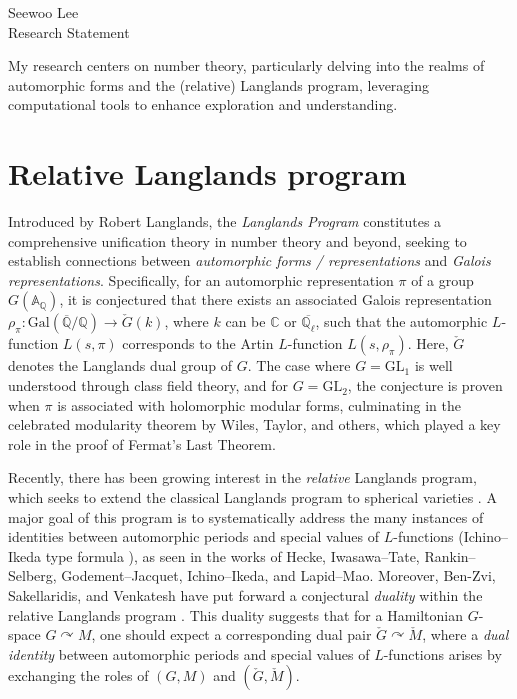 \documentclass[12pt]{article}
\begin{document}
\noindent Seewoo Lee \\
Research Statement \\
\bigskip



My research centers on number theory, particularly delving into the realms of automorphic forms and the (relative) Langlands program, leveraging computational tools to enhance exploration and understanding.


\section*{Relative Langlands program}

Introduced by Robert Langlands, the \emph{Langlands Program} constitutes a comprehensive unification theory in number theory and beyond, seeking to establish connections between \emph{automorphic forms / representations} and \emph{Galois representations}.
Specifically, for an automorphic representation $\pi$ of a group $G(\mathbb{A}_{\mathbb{Q}})$, it is conjectured that there exists an associated Galois representation $\rho_{\pi}: \mathrm{Gal}(\overline{\mathbb{Q}} / \mathbb{Q}) \to \check{G}(k)$, where $k$ can be $\mathbb{C}$ or $\overline{\mathbb{Q}_{\ell}}$, such that the automorphic $L$-function $L(s, \pi)$ corresponds to the Artin $L$-function $L(s, \rho_{\pi})$. Here, $\check{G}$ denotes the Langlands dual group of $G$. The case where $G = \mathrm{GL}_{1}$ is well understood through class field theory, and for $G = \mathrm{GL}_{2}$, the conjecture is proven when $\pi$ is associated with holomorphic modular forms, culminating in the celebrated modularity theorem by Wiles, Taylor, and others, which played a key role in the proof of Fermat’s Last Theorem.

Recently, there has been growing interest in the \emph{relative} Langlands program, which seeks to extend the classical Langlands program to spherical varieties \cite{sakellaridis2012spherical,sakellaridis2017periods}.
A major goal of this program is to systematically address the many instances of identities between automorphic periods and special values of $L$-functions (Ichino--Ikeda type formula \cite{ichino2010periods}), as seen in the works of Hecke, Iwasawa--Tate, Rankin--Selberg, Godement--Jacquet, Ichino--Ikeda, and Lapid--Mao. 
Moreover, Ben-Zvi, Sakellaridis, and Venkatesh have put forward a conjectural \emph{duality} within the relative Langlands program \cite{ben2023relative}.
This duality suggests that for a Hamiltonian $G$-space $G \curvearrowright M$, one should expect a corresponding dual pair $\check{G} \curvearrowright \check{M}$, where a \emph{dual identity} between automorphic periods and special values of $L$-functions arises by exchanging the roles of $(G, M)$ and $(\check{G}, \check{M})$.
\end{document}
